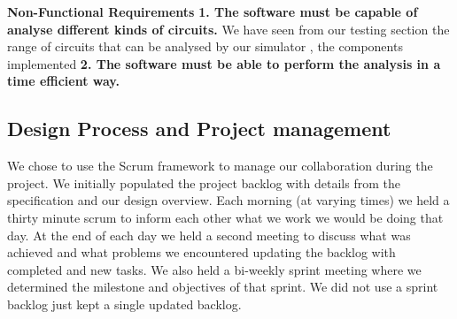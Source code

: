 \documentclass{article}
\begin{document}
\bigbreak

\textbf{Non-Functional Requirements}
\newline
\textbf{1. The software must be capable of analyse different kinds of circuits.}
\newline
We have seen from our testing section the range of circuits that can be analysed by our simulator , the components implemented 
\smallbreak
\textbf{2. The software must be able to perform the analysis in a time efficient way.}


\newpage
\subsection{Design Process and Project management}

We chose to use the Scrum framework to manage our collaboration during the project. We initially populated the project backlog with details from the specification and our design overview. Each morning (at varying times) we held a thirty minute scrum to inform each other what we work we would be doing that day. At the end of each day we held a second meeting to discuss what was achieved and what problems we encountered updating the backlog with completed and new tasks.
We also held a bi-weekly sprint meeting where we determined the milestone and objectives of that sprint. We did not use a sprint backlog just kept a single updated backlog. 
\end{document}
